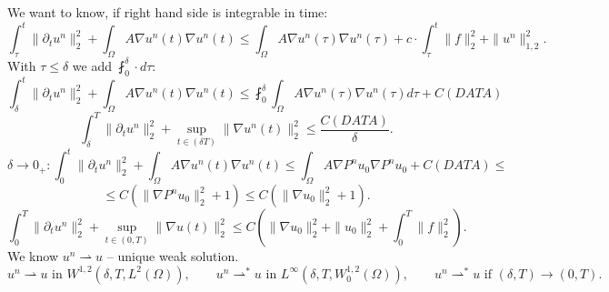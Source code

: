 \documentclass[12pt]{article}					%
\begin{document}
\begin{veta}
\begin{dukazin}
		We want to know, if right hand side is integrable in time:
		$$ \int_\tau^t \|\partial_t u^n\|_2^2 + \int_\Omega A \nabla u^n(t) \nabla u^n(t) ≤ \int_\Omega A \nabla u^n(\tau) \nabla u^n(\tau) + c·\int_\tau^t \|f\|_2^2 + \|u^n\|_{1, 2}^2. $$
		With $\tau ≤ \delta$ we add $\fint_0^\delta · d\tau$:
		$$ \int_\delta^t \|\partial_t u^n\|_2^2 + \int_\Omega A \nabla u^n(t) \nabla u^n(t) ≤ \fint_0^\delta \int_\Omega A \nabla u^n(\tau) \nabla u^n(\tau) d\tau + C(DATA) $$
		$$ \int_\delta^T \|\partial_t u^n\|_2^2 + \sup_{t \in (\delta T)} \|\nabla u^n(t)\|_2^2 ≤ \frac{C(DATA)}{\delta}. $$
		$$ \delta \rightarrow 0_+: \int_0^t \|\partial_t u^n\|_2^2 + \int_\Omega A \nabla u^n(t) \nabla u^n(t) ≤ \int_\Omega A \nabla P^n u_0 \nabla P^n u_0 + C(DATA) ≤ $$
		$$ ≤ C(\|\nabla P^n u_0\|_2^2 + 1) ≤ C(\|\nabla u_0\|_2^2 + 1). $$
		$$ \int_0^T \|\partial_t u^n\|_2^2 + \sup_{t \in (0, T)}\|\nabla u(t)\|_2^2 ≤ C(\|\nabla u_0\|_2^2 + \|u_0\|_2^2 + \int_0^T \|f\|_2^2). $$
		We know $u^n \rightharpoonup u$ – unique weak solution.
		$$ u^n \rightharpoonup u \text{ in } W^{1, 2}(\delta, T, L^2(\Omega)), \qquad u^n \rightharpoonup^* u \text{ in } L^∞(\delta, T, W_0^{1,2}(\Omega)), \qquad u^n \rightharpoonup^* u \text{ if } (\delta, T) \rightarrow (0, T). $$
	\end{dukazin}
\end{veta}
\end{document}

